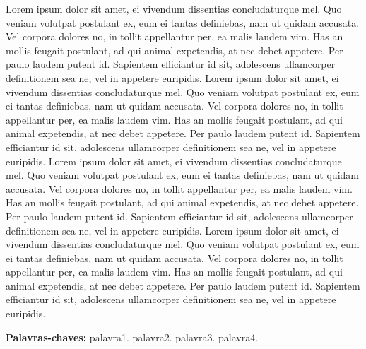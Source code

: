 \documentclass[
	12pt,				%
	openright,			%
	oneside,			%
	a4paper,			%
	english,			%
	french,				%
	spanish,			%
	brazil,				%
	]{abntex2}
\begin{document}
\begin{resumo}
\noindent
Lorem ipsum dolor sit amet, ei vivendum dissentias concludaturque mel. Quo veniam volutpat postulant ex, eum ei tantas definiebas, nam ut quidam accusata. Vel corpora dolores no, in tollit appellantur per, ea malis laudem vim. Has an mollis feugait postulant, ad qui animal expetendis, at nec debet appetere. Per paulo laudem putent id. Sapientem efficiantur id sit, adolescens ullamcorper definitionem sea ne, vel in appetere euripidis. Lorem ipsum dolor sit amet, ei vivendum dissentias concludaturque mel. Quo veniam volutpat postulant ex, eum ei tantas definiebas, nam ut quidam accusata. Vel corpora dolores no, in tollit appellantur per, ea malis laudem vim. Has an mollis feugait postulant, ad qui animal expetendis, at nec debet appetere. Per paulo laudem putent id. Sapientem efficiantur id sit, adolescens ullamcorper definitionem sea ne, vel in appetere euripidis. Lorem ipsum dolor sit amet, ei vivendum dissentias concludaturque mel. Quo veniam volutpat postulant ex, eum ei tantas definiebas, nam ut quidam accusata. Vel corpora dolores no, in tollit appellantur per, ea malis laudem vim. Has an mollis feugait postulant, ad qui animal expetendis, at nec debet appetere. Per paulo laudem putent id. Sapientem efficiantur id sit, adolescens ullamcorper definitionem sea ne, vel in appetere euripidis. Lorem ipsum dolor sit amet, ei vivendum dissentias concludaturque mel. Quo veniam volutpat postulant ex, eum ei tantas definiebas, nam ut quidam accusata. Vel corpora dolores no, in tollit appellantur per, ea malis laudem vim. Has an mollis feugait postulant, ad qui animal expetendis, at nec debet appetere. Per paulo laudem putent id. Sapientem efficiantur id sit, adolescens ullamcorper definitionem sea ne, vel in appetere euripidis.

 \vspace{\onelineskip}
    
 \noindent
 \textbf{Palavras-chaves:} palavra1. palavra2. palavra3. palavra4.
\end{resumo}
\end{document}
